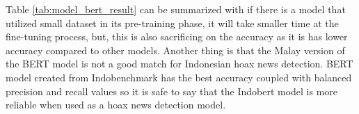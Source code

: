 Table \ref{tab:model_bert_result} can be summarized with if there is a model that utilized small dataset in its pre-training phase, it will take smaller time at the fine-tuning process, but, this is also sacrificing on the accuracy as it is has lower accuracy compared to other models. Another thing is that the Malay version of the BERT model is not a good match for Indonesian hoax news detection. BERT model created from Indobenchmark has the best accuracy coupled with balanced precision and recall values so it is safe to say that the Indobert model is more reliable when used as a hoax news detection model.
